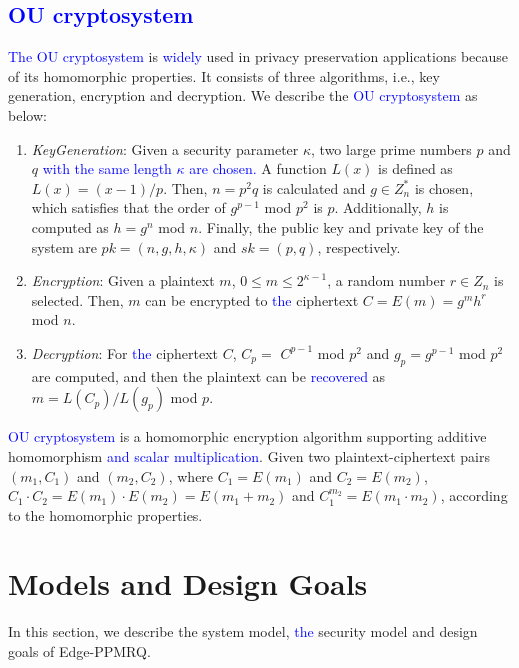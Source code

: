 \documentclass[IEEE JOURNAL OF BIOMEDICAL AND HEALTH INFORMATICS]{IEEEtran}
\begin{document}
{\subsection{\textcolor{blue}{OU cryptosystem}}
\textcolor{blue}{The OU cryptosystem} \cite{ou1998} is \textcolor{blue}{widely} used in privacy preservation applications because of its homomorphic properties. It consists of three algorithms, i.e., key generation, encryption and decryption. We describe the \textcolor{blue}{OU cryptosystem} as below:
\begin{enumerate}
	\item \emph{KeyGeneration}: Given a security parameter $\kappa$, two large prime numbers $p$ and $q$  \textcolor{blue}{with the same length $\kappa$ are chosen.} A function $L(x)$ is defined as $L(x)=(x-1)/p$. Then,  $n=p^2q$ is calculated and $g\in Z_n^{*}$ is chosen, which satisfies that the order of $g^{p-1}$ mod $p^2$ is $p$. Additionally, $h$ is computed as $h=g^n$ mod $n$. Finally, the public key and private key of the system are $pk=(n, g, h, \kappa)$ and $sk=(p, q)$, respectively.
	\item \emph{Encryption}: Given a plaintext $m$, $0\le m \le 2^{\kappa-1}$, a random number $r \in Z_n$ is selected. Then, $m$ can be encrypted to \textcolor{blue}{the} ciphertext  $C=E(m)=g^mh^r$ mod $n$.
	\item \emph{Decryption}: For \textcolor{blue}{the} ciphertext $C$, $C_p=$ $C^{p-1}$ mod $p^2$ and $g_p$$=$$g^{p-1}$ mod $p^2$ are computed, and then the plaintext can be \textcolor{blue}{recovered} as $m=L(C_p)/L(g_p)$ mod $p$.
\end{enumerate}

\textcolor{blue}{OU cryptosystem} is a homomorphic encryption algorithm supporting additive homomorphism \textcolor{blue}{and scalar multiplication}. Given two plaintext-ciphertext pairs $(m_1, C_1)$ and $(m_2, C_2)$, where $C_1=E(m_1) $ and $ C_2=E(m_2)$, $C_1  \cdot  C_2 = E(m_1) \cdot E(m_2) = E(m_1 + m_2)$ and $C_1^{m_2}=E(m_1 \cdot m_2)$, according to the homomorphic properties.

\section{Models and Design Goals}
In this section, we describe the system model, \textcolor{blue}{the} security model and design goals of Edge-PPMRQ.

}
\end{document}
